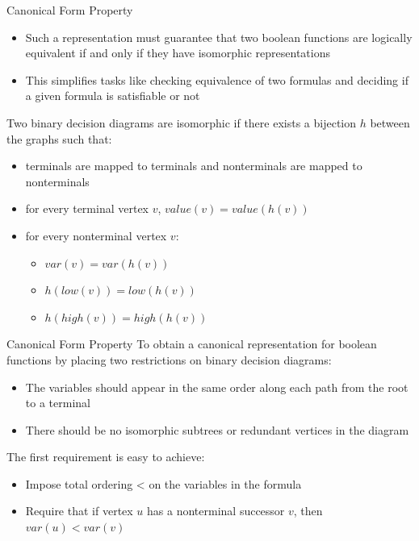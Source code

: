 \documentclass{beamer}
\begin{document}
\begin{frame}{Canonical Form Property}
\begin{itemize}
\item Such a representation must guarantee that two boolean functions are logically equivalent if and only if they have isomorphic representations
\item This simplifies tasks like checking equivalence of two formulas and deciding if a given formula is satisfiable or not
\end{itemize}
Two binary decision diagrams are isomorphic if there exists a bijection $h$ between the graphs such that:
\begin{itemize}
\item terminals are mapped to terminals and nonterminals are mapped to nonterminals
\item for every terminal vertex $v$, $value(v) = value(h(v))$
\item for every nonterminal vertex $v$:
\begin{itemize}
\item $var(v) = var(h(v))$
\item $h(low(v)) = low(h(v))$
\item $h(high(v)) = high(h(v))$
\end{itemize}
\end{itemize}
\end{frame}

\begin{frame}{Canonical Form Property}
To obtain a canonical representation for boolean functions by placing two restrictions on binary decision diagrams:
\begin{itemize}
\item The variables should appear in the same order along each path from the root to a terminal
\item There should be no isomorphic subtrees or redundant vertices in the diagram
\end{itemize}
The first requirement is easy to achieve:
\begin{itemize}
\item Impose total ordering < on the variables in the formula
\item Require that if vertex $u$ has a nonterminal successor $v$, then $var(u) < var(v)$
\end{itemize}
\end{frame}
\end{document}
